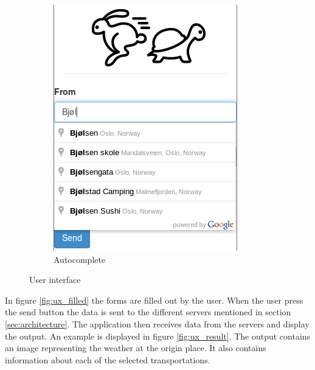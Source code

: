\documentclass[10pt,a4paper]{article}
\begin{document}
\begin{figure}[h]
\begin{subfigure}{0.4\textwidth}
    \includegraphics[width=\textwidth]{../ux/autocomplete}
    \caption{Autocomplete}
\label{fig:ux_autocomplete}
  \end{subfigure}
  \caption{User interface}
  \label{fig:ux_first}
\end{figure}
In figure \ref{fig:ux_filled} the forms are filled out by the user. When the user press the send button the data is sent to the different servers mentioned in section \ref{sec:architecture}. The application then receives data from the servers and display the output. An example is displayed in figure \ref{fig:ux_result}. The output contains an image representing the weather at the origin place. It also contains information about each of the selected transportations.
\end{document}
